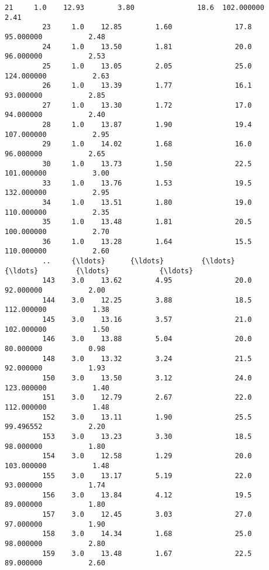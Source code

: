 \documentclass[11pt]{article}
\begin{document}
\begin{Verbatim}[commandchars=\\\{\}]
         21     1.0    12.93        3.80               18.6  102.000000           2.41   
         23     1.0    12.85        1.60               17.8   95.000000           2.48   
         24     1.0    13.50        1.81               20.0   96.000000           2.53   
         25     1.0    13.05        2.05               25.0  124.000000           2.63   
         26     1.0    13.39        1.77               16.1   93.000000           2.85   
         27     1.0    13.30        1.72               17.0   94.000000           2.40   
         28     1.0    13.87        1.90               19.4  107.000000           2.95   
         29     1.0    14.02        1.68               16.0   96.000000           2.65   
         30     1.0    13.73        1.50               22.5  101.000000           3.00   
         33     1.0    13.76        1.53               19.5  132.000000           2.95   
         34     1.0    13.51        1.80               19.0  110.000000           2.35   
         35     1.0    13.48        1.81               20.5  100.000000           2.70   
         36     1.0    13.28        1.64               15.5  110.000000           2.60   
         ..     {\ldots}      {\ldots}         {\ldots}                {\ldots}         {\ldots}            {\ldots}   
         143    3.0    13.62        4.95               20.0   92.000000           2.00   
         144    3.0    12.25        3.88               18.5  112.000000           1.38   
         145    3.0    13.16        3.57               21.0  102.000000           1.50   
         146    3.0    13.88        5.04               20.0   80.000000           0.98   
         148    3.0    13.32        3.24               21.5   92.000000           1.93   
         150    3.0    13.50        3.12               24.0  123.000000           1.40   
         151    3.0    12.79        2.67               22.0  112.000000           1.48   
         152    3.0    13.11        1.90               25.5   99.496552           2.20   
         153    3.0    13.23        3.30               18.5   98.000000           1.80   
         154    3.0    12.58        1.29               20.0  103.000000           1.48   
         155    3.0    13.17        5.19               22.0   93.000000           1.74   
         156    3.0    13.84        4.12               19.5   89.000000           1.80   
         157    3.0    12.45        3.03               27.0   97.000000           1.90   
         158    3.0    14.34        1.68               25.0   98.000000           2.80   
         159    3.0    13.48        1.67               22.5   89.000000           2.60   

\end{Verbatim}
\end{document}
